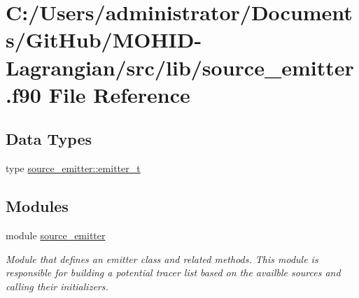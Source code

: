\hypertarget{source__emitter_8f90}{}\section{C\+:/\+Users/administrator/\+Documents/\+Git\+Hub/\+M\+O\+H\+I\+D-\/\+Lagrangian/src/lib/source\+\_\+emitter.f90 File Reference}
\label{source__emitter_8f90}
\subsection*{Data Types}
\begin{DoxyCompactItemize}
\item 
type \hyperlink{structsource__emitter_1_1emitter__t}{source\+\_\+emitter\+::emitter\+\_\+t}
\end{DoxyCompactItemize}
\subsection*{Modules}
\begin{DoxyCompactItemize}
\item 
module \hyperlink{namespacesource__emitter}{source\+\_\+emitter}
\begin{DoxyCompactList}\small\item\em Module that defines an emitter class and related methods. This module is responsible for building a potential tracer list based on the availble sources and calling their initializers. \end{DoxyCompactList}\end{DoxyCompactItemize}
